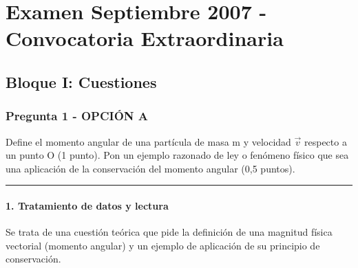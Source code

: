 \chapter{Examen Septiembre 2007 - Convocatoria Extraordinaria}
\label{chap:2007_sep_ext}

\section{Bloque I: Cuestiones}
\label{sec:grav_2007_sep_ext}

\subsection{Pregunta 1 - OPCIÓN A}
\label{subsec:1A_2007_sep_ext}

\begin{cajaenunciado}
Define el momento angular de una partícula de masa m y velocidad $\vec{v}$ respecto a un punto O (1 punto). Pon un ejemplo razonado de ley o fenómeno físico que sea una aplicación de la conservación del momento angular (0,5 puntos).
\end{cajaenunciado}
\hrule

\subsubsection*{1. Tratamiento de datos y lectura}
Se trata de una cuestión teórica que pide la definición de una magnitud física vectorial (momento angular) y un ejemplo de aplicación de su principio de conservación.


